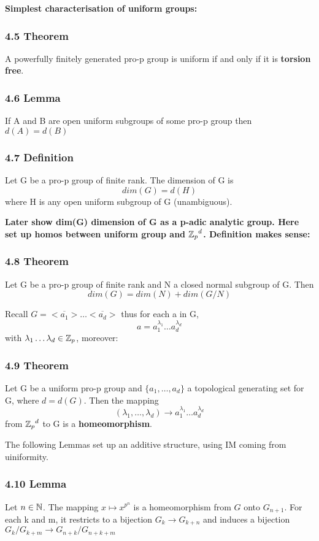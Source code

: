 \textbf{Simplest characterisation of uniform groups:}

\subsubsection*{4.5 Theorem}
A powerfully finitely generated pro-p group is uniform if and only if it is \textbf{torsion free}.

\subsubsection*{4.6 Lemma}
If A and B are open uniform subgroups of some pro-p group then $d(A) = d(B)$

\subsubsection*{4.7 Definition}
Let G be a pro-p group of finite rank. The dimension of G is
$$dim(G) = d(H)$$ where H is any open uniform subgroup of G (unambiguous).

\textbf{Later show dim(G) dimension of G as a p-adic analytic group. Here set up homos between uniform group and ${\mathbb Z_p}^d$. Definition makes sense:}

\subsubsection*{4.8 Theorem}
Let G be a pro-p group of finite rank and N a closed normal subgroup of G. Then 
$$dim(G) = dim (N) +dim(G/N)$$

Recall $G=\overline{<a_1>}\dots \overline{<a_d>}$ thus for each a in G,
$$a = a_1^{\lambda_1}\dots a_d^{\lambda_d}$$ with $\lambda_1 \dots \lambda_d \in \mathbb Z_p$, moreover:

\subsubsection*{4.9 Theorem}
Let G be a uniform pro-p group and $\{a_1, \dots , a_d\}$ a topological generating set for G, where $d=d(G)$. Then the mapping
$$(\lambda_1,\dots , \lambda_d)\rightarrow a_1^{\lambda_1}\dots a_d^{\lambda_d}$$ from ${\mathbb Z_p}^d$ to G is a \textbf{homeomorphism}.

The following Lemmas set up an additive structure, using IM coming from uiniformity.

\subsubsection*{4.10 Lemma}
Let $n\in \mathbb N$. The mapping $x\mapsto x^{p^n}$ is a homeomorphism from $G$ onto $G_{n+1}$. For each k and m, it restricts to a bijection $G_k\rightarrow G_{k+n}$ and induces a bijection $G_k/G_{k+m} \rightarrow G_{n+k} / G_{n+k+m}$


